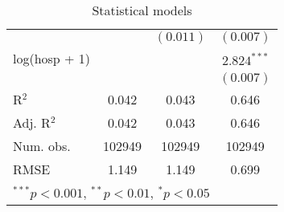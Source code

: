 \begin{table}
\begin{center}
{\begin{tabular}{l c c c }
                             &                & $(0.011)$      & $(0.007)$      \\
log(hosp + 1)                &                &                & $2.824^{***}$  \\
                             &                &                & $(0.007)$      \\
\hline
R$^2$                        & 0.042          & 0.043          & 0.646          \\
Adj. R$^2$                   & 0.042          & 0.043          & 0.646          \\
Num. obs.                    & 102949         & 102949         & 102949         \\
RMSE                         & 1.149          & 1.149          & 0.699          \\
\hline
\multicolumn{4}{l}{\scriptsize{$^{***}p<0.001$, $^{**}p<0.01$, $^*p<0.05$}}
\end{tabular}%
}
\caption{Statistical models}
\label{tab:fit_cpq}
\end{center}
\end{table}
